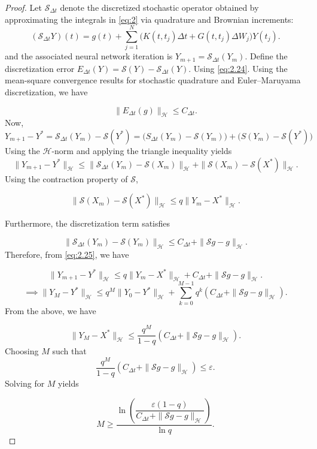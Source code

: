 \documentclass[10pt,a4paper]{amsart}
\begin{document}
\begin{proof}
Let $\mathcal S_{\Delta t}$ denote the discretized stochastic operator 
obtained by approximating the integrals in \eqref{eq:2} via quadrature and 
Brownian increments:
\begin{equation}
(\mathcal S_{\Delta t}Y)(t)
=
g(t)
+
\sum_{j=1}^{N}
\Big(
K(t,t_j)\Delta t
+
G(t,t_j)\Delta W_j
\Big)Y(t_j).
\label{eq:2.24}
\end{equation}
and the associated neural network iteration is
$Y_{m+1}=\mathcal S_{\Delta t}(Y_m).$ Define the discretization error
$E_{\Delta t}(Y)
=\mathcal S(Y)-\mathcal S_{\Delta t}(Y).$
Using \eqref{eq:2.24}. Using the mean-square convergence results for stochastic quadrature and Euler–Maruyama discretization, we have

\[
\|E_{\Delta t}(g)\|_{\mathcal H}
\le
C_{\Delta t}.
\]
Now, \[
Y_{m+1}-Y^\ast
=
\mathcal S_{\Delta t}(Y_m)-\mathcal S(Y^\ast)=\big(S_{\Delta t}(Y_m)-\mathcal S(Y_m)\big)+\big(S(Y_m)-\mathcal S(Y^\ast)\big)
\]
Using the $\mathcal H$-norm and applying the triangle inequality yields
\begin{equation}
    \|Y_{m+1}-Y^\ast\|_{\mathcal H}
\le
\|\mathcal S_{\Delta t}(Y_m)-\mathcal S(X_m)\|_{\mathcal H}
+
\|\mathcal S(X_m)-\mathcal S(X^\ast)\|_{\mathcal H}.
\label{eq:2.25}
\end{equation}
Using the contraction property of $\mathcal S$,

\[
\|\mathcal S(X_m)-\mathcal S(X^\ast)\|_{\mathcal H}
\le
q\|Y_m-X^\ast\|_{\mathcal H}.
\]

Furthermore, the discretization term satisfies

\[
\|\mathcal S_{\Delta t}(Y_m)-\mathcal S(Y_m)\|_{\mathcal H}
\le
C_{\Delta t}+\|\mathcal S g-g\|_{\mathcal H}.
\]
Therefore, from \eqref{eq:2.25}, we have 

\[
\|Y_{m+1}-Y^\ast\|_{\mathcal H}
\le
q\|Y_m-X^\ast\|_{\mathcal H}
+
C_{\Delta t}
+
\|\mathcal S g-g\|_{\mathcal H}.
\]
\[
\implies\|Y_M-Y^\ast\|_{\mathcal H}
\le
q^M\|Y_0-Y^\ast\|_{\mathcal H}
+
\sum_{k=0}^{M-1} q^k
\left(
C_{\Delta t}
+
\|\mathcal S g-g\|_{\mathcal H}
\right).
\]
From the above, we have

\[
\|Y_M-X^\ast\|_{\mathcal H}
\le
\frac{q^M}{1-q}
\left(
C_{\Delta t}
+
\|\mathcal S g-g\|_{\mathcal H}
\right).
\]
Choosing  $M$ such that
\[
\frac{q^M}{1-q}
\left(
C_{\Delta t}
+
\|\mathcal S g-g\|_{\mathcal H}
\right)
\le
\varepsilon.
\]
Solving for $M$ yields

\[
M
\ge
\frac{
\ln\!\left(
\dfrac{\varepsilon(1-q)}
{C_{\Delta t}+\|\mathcal S g-g\|_{\mathcal H}}
\right)
}{\ln q}.
\]
\end{proof}
\end{document}

